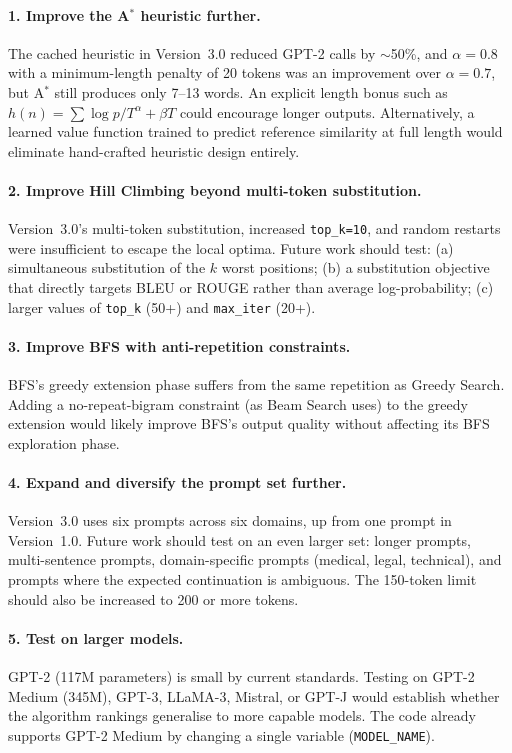 \documentclass[12pt]{article}
\begin{document}
	\paragraph{1. Improve the A$^*$ heuristic further.}
	The cached heuristic in Version~3.0 reduced GPT-2 calls by $\sim$50\%, and $\alpha = 0.8$ with a minimum-length penalty of 20 tokens was an improvement over $\alpha = 0.7$, but A$^*$ still produces only 7--13 words. An explicit length bonus such as $h(n) = \sum \log p / T^{\alpha} + \beta T$ could encourage longer outputs. Alternatively, a learned value function trained to predict reference similarity at full length would eliminate hand-crafted heuristic design entirely.
	
	\paragraph{2. Improve Hill Climbing beyond multi-token substitution.}
	Version~3.0's multi-token substitution, increased \texttt{top\_k=10}, and random restarts were insufficient to escape the local optima. Future work should test: (a) simultaneous substitution of the $k$ worst positions; (b) a substitution objective that directly targets BLEU or ROUGE rather than average log-probability; (c) larger values of \texttt{top\_k} (50+) and \texttt{max\_iter} (20+).
	
	\paragraph{3. Improve BFS with anti-repetition constraints.}
	BFS's greedy extension phase suffers from the same repetition as Greedy Search. Adding a no-repeat-bigram constraint (as Beam Search uses) to the greedy extension would likely improve BFS's output quality without affecting its BFS exploration phase.
	
	\paragraph{4. Expand and diversify the prompt set further.}
	Version~3.0 uses six prompts across six domains, up from one prompt in Version~1.0. Future work should test on an even larger set: longer prompts, multi-sentence prompts, domain-specific prompts (medical, legal, technical), and prompts where the expected continuation is ambiguous. The 150-token limit should also be increased to 200 or more tokens.
	
	\paragraph{5. Test on larger models.}
	GPT-2 (117M parameters) is small by current standards. Testing on GPT-2 Medium (345M), GPT-3, LLaMA-3, Mistral, or GPT-J would establish whether the algorithm rankings generalise to more capable models. The code already supports GPT-2 Medium by changing a single variable (\texttt{MODEL\_NAME}).
	
\end{document}
